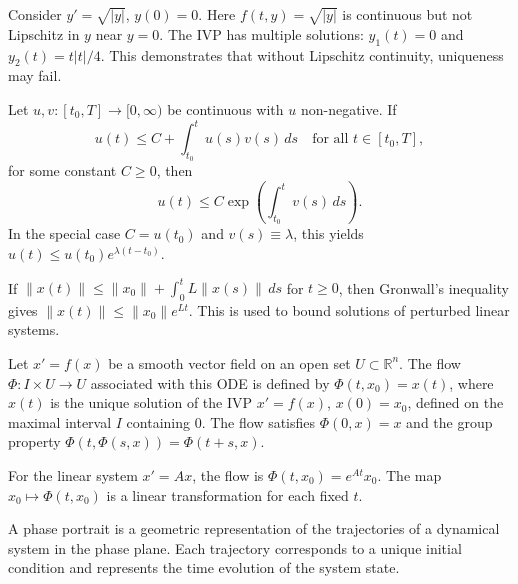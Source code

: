 \begin{example}
Consider $y' = \sqrt{|y|}$, $y(0) = 0$. Here $f(t, y) = \sqrt{|y|}$ is continuous but not Lipschitz in $y$ near $y = 0$. The IVP has multiple solutions: $y_1(t) = 0$ and $y_2(t) = t|t|/4$. This demonstrates that without Lipschitz continuity, uniqueness may fail.
\end{example}

\begin{definition}
Let $u, v: [t_0, T] \to [0, \infty)$ be continuous with $u$ non-negative. If
\[
u(t) \leq C + \int_{t_0}^t u(s) v(s) \, ds \quad \text{for all } t \in [t_0, T],
\]
for some constant $C \geq 0$, then
\[
u(t) \leq C \exp\left( \int_{t_0}^t v(s) \, ds \right).
\]
In the special case $C = u(t_0)$ and $v(s) \equiv \lambda$, this yields $u(t) \leq u(t_0) e^{\lambda (t - t_0)}$.
\end{definition}

\begin{example}
If $\|x(t)\| \leq \|x_0\| + \int_0^t L \|x(s)\| \, ds$ for $t \geq 0$, then Gronwall's inequality gives $\|x(t)\| \leq \|x_0\| e^{Lt}$. This is used to bound solutions of perturbed linear systems.
\end{example}

\begin{definition}
Let $x' = f(x)$ be a smooth vector field on an open set $U \subset \mathbb{R}^n$. The flow $\Phi: I \times U \to U$ associated with this ODE is defined by $\Phi(t, x_0) = x(t)$, where $x(t)$ is the unique solution of the IVP $x' = f(x)$, $x(0) = x_0$, defined on the maximal interval $I$ containing $0$. The flow satisfies $\Phi(0, x) = x$ and the group property $\Phi(t, \Phi(s, x)) = \Phi(t+s, x)$.
\end{definition}

\begin{example}
For the linear system $x' = Ax$, the flow is $\Phi(t, x_0) = e^{At} x_0$. The map $x_0 \mapsto \Phi(t, x_0)$ is a linear transformation for each fixed $t$.
\end{example}

\begin{definition}
A phase portrait is a geometric representation of the trajectories of a dynamical system in the phase plane. Each trajectory corresponds to a unique initial condition and represents the time evolution of the system state.
\end{definition}

